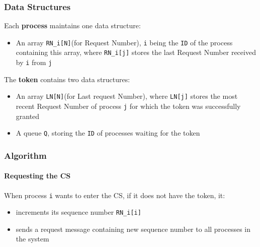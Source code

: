 
\subsubsection{Data Structures}
Each \textbf{process} maintains one data structure:
\begin{itemize}
   \item An array \lstinline|RN_i[N]|(for Request Number), \lstinline|i| being the \lstinline|ID| of the process containing this array, where \lstinline|RN_i[j]| stores the last Request Number received by \lstinline|i| from \lstinline|j|
\end{itemize}

The \textbf{token} contains two data
structures:
\begin{itemize}
	\item An array \lstinline|LN[N]|(for Last request Number), where \lstinline|LN[j]| stores the most recent Request Number of process \lstinline|j| for which the token was successfully granted
	\item A queue \lstinline|Q|, storing the \lstinline|ID| of processes waiting for the token
\end{itemize}

\subsubsection{Algorithm}
\paragraph*{Requesting the CS}
When process \lstinline|i| wants to enter the CS, if it does not have the token, it:
\begin{itemize}
	\item increments its sequence number \lstinline|RN_i[i]|
	\item sends a request message containing new sequence number to all processes in the system
\end{itemize}

